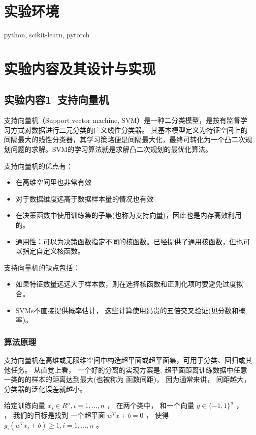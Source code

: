 \documentclass[lang=cn,a4paper]{shu-lab-report}
\begin{document}
\section{实验环境}
python, scikit-learn, pytorch

\section{实验内容及其设计与实现}

\subsection{实验内容1~支持向量机}
支持向量机（Support vector machine, SVM）是一种二分类模型，是按有监督学习方式对数据进行二元分类的广义线性分类器。
其基本模型定义为特征空间上的间隔最大的线性分类器，其学习策略便是间隔最大化，最终可转化为一个凸二次规划问题的求解。SVM的学习算法就是求解凸二次规划的最优化算法。

支持向量机的优点有：
\begin{itemize}
    \item 在高维空间里也非常有效
    \item 对于数据维度远高于数据样本量的情况也有效
    \item 在决策函数中使用训练集的子集(也称为支持向量)，因此也是内存高效利用的。
    \item 通用性：可以为决策函数指定不同的核函数。已经提供了通用核函数，但也可以指定自定义核函数。
\end{itemize}

支持向量机的缺点包括：
\begin{itemize}
    \item 如果特征数量远远大于样本数，则在选择核函数和正则化项时要避免过度拟合。
    \item SVMs不直接提供概率估计， 这些计算使用昂贵的五倍交叉验证(见分数和概率)。
\end{itemize}

\subsubsection{算法原理}
支持向量机在高维或无限维空间中构造超平面或超平面集，可用于分类、回归或其他任务。
从直觉上看， 一个好的分离的实现方案是, 
超平面距离训练数据中任意一类的的样本的距离达到最大(也被称为 函数间距)， 
因为通常来讲， 间距越大， 分类器的泛化误差就越小。

给定训练向量 $x_i \in R^n, i =1, ..., n$ ， 在两个类中， 和一个向量 $y \in \{-1, 1\}^n$ ，
， 我们的目标是找到 一个超平面 $w^T x + b = 0$ ， 使得 $y_i (w^T x_i + b) \geq 1, i = 1, ..., n$ 。
\end{document}
